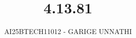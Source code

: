 \documentclass[journal]{IEEEtran}
\begin{document}



\title{4.13.81}
\author{AI25BTECH11012 - GARIGE UNNATHI}
{\let\newpage\relax\maketitle}


\renewcommand{\thefigure}{\theenumi}
\renewcommand{\thetable}{\theenumi}
\setlength{\intextsep}{10pt} %



\vspace{-1cm}
\end{document}
